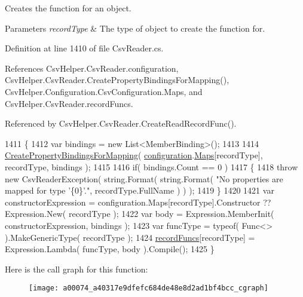 Creates the function for an object. 


\begin{DoxyParams}{Parameters}
{\em record\-Type} & The type of object to create the function for.\\
\hline
\end{DoxyParams}


Definition at line 1410 of file Csv\-Reader.\-cs.



References Csv\-Helper.\-Csv\-Reader.\-configuration, Csv\-Helper.\-Csv\-Reader.\-Create\-Property\-Bindings\-For\-Mapping(), Csv\-Helper.\-Configuration.\-Csv\-Configuration.\-Maps, and Csv\-Helper.\-Csv\-Reader.\-record\-Funcs.



Referenced by Csv\-Helper.\-Csv\-Reader.\-Create\-Read\-Record\-Func().


\begin{DoxyCode}
1411         \{
1412             var bindings = \textcolor{keyword}{new} List<MemberBinding>();
1413 
1414             \hyperlink{a00074_a5d8c85bf8923d38ead3df9b9463f3eae}{CreatePropertyBindingsForMapping}( 
      \hyperlink{a00074_a695622911e45cbac8d67dcbd9a3e2967}{configuration}.\hyperlink{a00060_a9119c99f5dafba985718f631f7bfa16a}{Maps}[recordType], recordType, bindings );
1415 
1416             \textcolor{keywordflow}{if}( bindings.Count == 0 )
1417             \{
1418                 \textcolor{keywordflow}{throw} \textcolor{keyword}{new} CsvReaderException( \textcolor{keywordtype}{string}.Format( \textcolor{keywordtype}{string}.Format( \textcolor{stringliteral}{"No properties are mapped for
       type '\{0\}'."}, recordType.FullName ) ) );
1419             \}
1420 
1421             var constructorExpression = configuration.Maps[recordType].Constructor ?? Expression.New( 
      recordType );
1422             var body = Expression.MemberInit( constructorExpression, bindings );
1423             var funcType = typeof( Func<> ).MakeGenericType( recordType );
1424             \hyperlink{a00074_af8fa2e4c94750a1d6df3112d5f1d701c}{recordFuncs}[recordType] = Expression.Lambda( funcType, body ).Compile();
1425         \}
\end{DoxyCode}


Here is the call graph for this function\-:
\nopagebreak
\begin{figure}[H]
\begin{center}
\leavevmode
\texttt{[image: a00074\_a40317e9dfefc684de48e8d2ad1bf4bcc\_cgraph]}
\end{center}
\end{figure}




